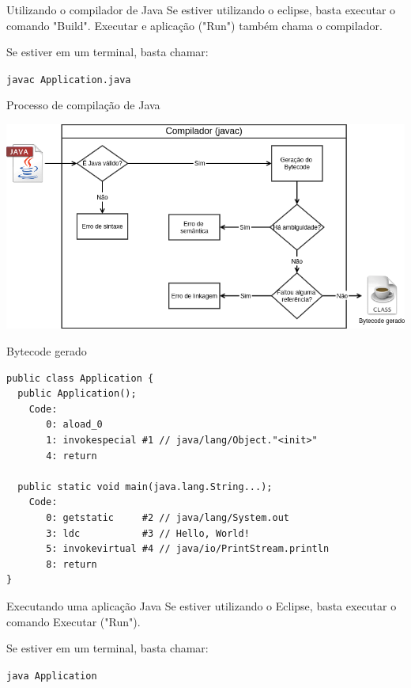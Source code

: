 \documentclass{beamer}
\begin{document}
\begin{frame}{Utilizando o compilador de Java}
    Se estiver utilizando o eclipse, basta executar o comando "Build". Executar
    e aplicação ("Run") também chama o compilador.

    Se estiver em um terminal, basta chamar:

    \texttt{javac Application.java}
\end{frame}


\begin{frame}{Processo de compilação de Java}
    \begin{center}
        \includegraphics[keepaspectratio,width=1\textwidth,height=1\textheight]{compilation_scheme}
    \end{center}
\end{frame}


\begin{frame}[fragile]{Bytecode gerado}
    \begin{verbatim}
public class Application {
  public Application();
    Code:
       0: aload_0
       1: invokespecial #1 // java/lang/Object."<init>"
       4: return

  public static void main(java.lang.String...);
    Code:
       0: getstatic     #2 // java/lang/System.out
       3: ldc           #3 // Hello, World!
       5: invokevirtual #4 // java/io/PrintStream.println
       8: return
}
    \end{verbatim}
\end{frame}


\begin{frame}{Executando uma aplicação Java}
    Se estiver utilizando o Eclipse, basta executar o comando Executar ("Run").

    Se estiver em um terminal, basta chamar:

    \texttt{java Application}
\end{frame}
\end{document}
